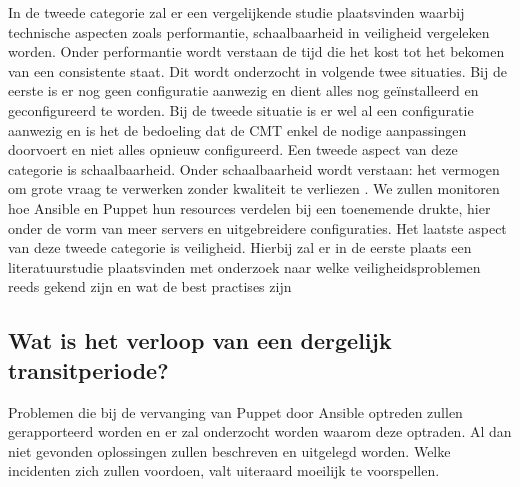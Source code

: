 In de tweede categorie zal er een vergelijkende studie plaatsvinden waarbij technische aspecten zoals performantie, schaalbaarheid in veiligheid vergeleken worden. Onder performantie wordt verstaan de tijd die het kost tot het bekomen van een consistente staat. Dit wordt onderzocht in volgende twee situaties. Bij de eerste is er nog geen configuratie aanwezig en dient alles nog ge\"installeerd en geconfigureerd te worden. Bij de tweede situatie is er wel al een configuratie aanwezig en is het de bedoeling dat de CMT enkel de nodige aanpassingen doorvoert en niet alles opnieuw configureerd. Een tweede aspect van deze categorie is schaalbaarheid. Onder schaalbaarheid wordt verstaan: het vermogen om grote vraag te verwerken zonder kwaliteit te verliezen \autocite{informit}. We zullen monitoren hoe Ansible en Puppet hun resources verdelen bij een toenemende drukte, hier onder de vorm van meer servers en uitgebreidere configuraties. Het laatste aspect van deze tweede categorie is veiligheid. Hierbij zal er in de eerste plaats een literatuurstudie plaatsvinden met onderzoek naar welke veiligheidsproblemen reeds gekend zijn en wat de best practises zijn


\subsection{Wat is het verloop van een dergelijk transitperiode?}

Problemen die bij de vervanging van Puppet door Ansible optreden zullen gerapporteerd worden en er zal onderzocht worden waarom deze optraden. Al dan niet gevonden oplossingen zullen beschreven en uitgelegd worden. Welke incidenten zich zullen voordoen, valt uiteraard moeilijk te voorspellen. 




